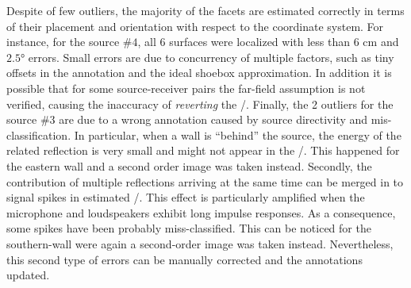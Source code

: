 \mynewline
Despite of few outliers, the majority of the facets are estimated correctly in terms of their placement and orientation with respect to the coordinate system.
For instance, for the source $\#4$, all 6 surfaces were localized with less than $6$ cm and $\ang{2.5}$ errors.
Small errors are due to concurrency of multiple factors, such as tiny offsets in the annotation and the ideal shoebox approximation.
In addition it is possible that for some source-receiver pairs the far-field assumption is not verified, causing the inaccuracy of \textit{reverting} the \ISM/.
Finally, the 2 outliers for the source \#3 are due to a wrong annotation caused by source directivity and mis-classification.
In particular, when a wall is ``behind'' the source, the energy of the related reflection is very small and might not appear in the \RIRs/.
This happened for the eastern wall and a second order image was taken instead.
Secondly, the contribution of multiple reflections arriving at the same time can be merged in to signal spikes in estimated \RIRs/.
This effect is particularly amplified when the microphone and loudspeakers exhibit long impulse responses.
As a consequence, some spikes have been probably miss-classified.
This can be noticed for the southern-wall were again a second-order image was taken instead.
Nevertheless, this second type of errors can be manually corrected and the annotations updated.

